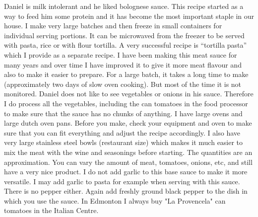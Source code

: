 \documentclass[11pt,letterpaper]{article}
\begin{document}


Daniel is milk intolerant and he liked bolognese sauce. This recipe started as a way to feed him some protein and it has become the most important staple in our house. I make very large batches and then freeze in small containers for individual serving portions. It can be microwaved from the freezer to be served with pasta, rice or with flour tortilla. A very successful recipe is ``tortilla pasta'' which I provide as a separate recipe. I have been making this meat sauce for many years and over time I have improved it to give it more meat flavour and also to make it easier to prepare. For a large batch, it takes a long time to make (approximately two days of slow oven cooking). But most of the time it is not monitored. Daniel does not like to see vegetables or onions in his sauce. Therefore I do process all the vegetables, including the can tomatoes in the food processor to make sure that the sauce has no chunks of anything. I have large ovens and large dutch oven pans. Before you make, check your equipment and oven to make sure that you can fit everything and adjust the recipe accordingly. I also have very large stainless steel bowls (restaurant size) which makes it much easier to mix the meat with the wine and seasonings before starting. The quantities are an approximation. You can vary the amount of meat, tomatoes, onions, etc, and still have a very nice product. I do not add garlic to this base sauce to make it more versatile. I may add garlic to pasta for example when serving with this sauce. There is no pepper either. Again add freshly ground black pepper to the dish in which you use the sauce. In Edmonton I always buy "La Provencela" can tomatoes in the Italian Centre.
\end{document}
